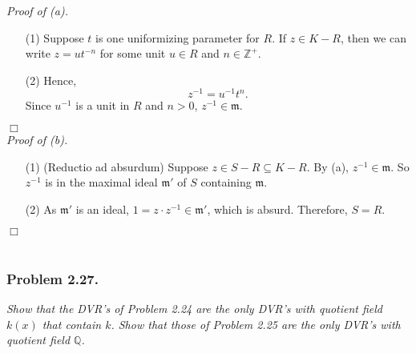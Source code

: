 \documentclass{article}
\begin{document}
\emph{Proof of (a).}
\begin{enumerate}
\item[(1)]
  Suppose $t$ is one uniformizing parameter for $R$.
  If $z \in K - R$,
  then we can write $z = ut^{-n}$ for some unit $u \in R$ and $n \in \mathbb{Z}^{+}$.

\item[(2)]
  Hence,
  \[
    z^{-1} = u^{-1} t^n.
  \]
  Since $u^{-1}$ is a unit in $R$ and $n > 0$, $z^{-1} \in \mathfrak{m}$.
\end{enumerate}
$\Box$ \\



\emph{Proof of (b).}
\begin{enumerate}
\item[(1)]
  (Reductio ad absurdum)
  Suppose $z \in S - R \subseteq K - R$.
  By (a), $z^{-1} \in \mathfrak{m}$.
  So $z^{-1}$ is in the maximal ideal $\mathfrak{m}'$ of $S$ containing $\mathfrak{m}$.

\item[(2)]
  As $\mathfrak{m}'$ is an ideal,
  $1 = z \cdot z^{-1} \in \mathfrak{m}'$, which is absurd.
  Therefore, $S = R$.
\end{enumerate}
$\Box$ \\\\






\subsubsection*{Problem 2.27.}
\emph{Show that the DVR's of Problem 2.24 are
the only DVR's with quotient field $k(x)$ that contain $k$.
Show that those of Problem 2.25 are the only DVR's with quotient field $\mathbb{Q}$.} \\
\end{document}

